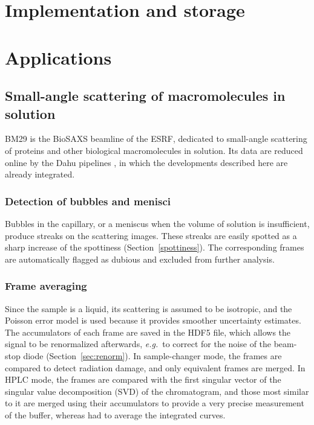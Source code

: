 \documentclass{iucrjournals}
\newcommand{\XX}{X^{(2)}}
\begin{document}
\section{Implementation and storage}
\label{sec:implementation}

\section{Applications}
\label{sec:applications}

\subsection{Small-angle scattering of macromolecules in solution}
\label{sec:saxs}
BM29 is the BioSAXS beamline of the ESRF, dedicated to small-angle scattering of proteins and other biological macromolecules in solution.
Its data are reduced online by the Dahu pipelines \cite{Kieffer2022}, in which the developments described here are already integrated.

\subsubsection{Detection of bubbles and menisci}
Bubbles in the capillary, or a meniscus when the volume of solution is insufficient, produce streaks on the scattering images.
These streaks are easily spotted as a sharp increase of the spottiness (Section~\ref{spottiness}).
The corresponding frames are automatically flagged as dubious and excluded from further analysis.

\subsubsection{Frame averaging}
Since the sample is a liquid, its scattering is assumed to be isotropic, and the Poisson error model is used because it provides smoother uncertainty estimates.
The accumulators of each frame are saved in the HDF5 file, which allows the signal to be renormalized afterwards, \emph{e.g.}\ to correct for the noise of the beam-stop diode (Section~\ref{sec:renorm}).
In sample-changer mode, the frames are compared to detect radiation damage, and only equivalent frames are merged.
In HPLC mode, the frames are compared with the first singular vector of the singular value decomposition (SVD) of the chromatogram, and those most similar to it are merged using their accumulators to provide a very precise measurement of the buffer, whereas  had to average the integrated curves.
\end{document}
